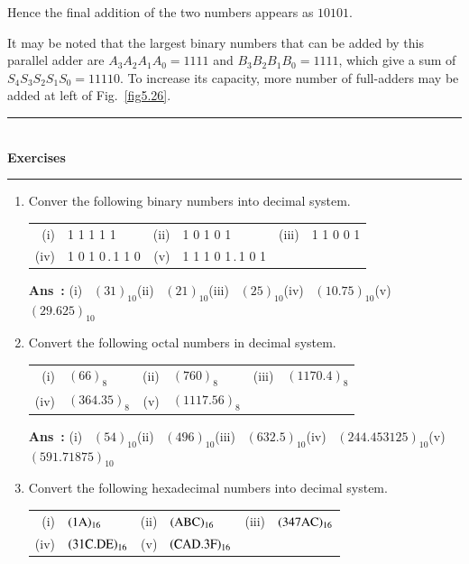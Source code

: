 Hence the final addition of the two numbers appears as $10101$.

It may be noted that the largest binary numbers that can be added by this parallel adder are $A_{3}A_{2}A_{1}A_{0}=1111$ and $B_{3}B_{2}B_{1}B_{0}=1111$, which give a sum of $S_{4}S_{3}S_{2}S_{1}S_{0}=11110$. To increase its capacity, more number of full-adders may be added at left of Fig.~\ref{fig5.26}.

\begin{center}
\rule{4cm}{1pt}\\
{\bf\Large Exercises}\\[-3pt]
\rule{4cm}{1pt}
\end{center}

\begin{enumerate}
\renewcommand{\labelenumi}{\bf\theenumi.}
\item Conver the following binary numbers into decimal system.

\smallskip
\begin{tabular}{r@{\;}l@{\qquad}r@{\;}l@{\qquad}r@{\;}l}
(i) & 1 1 1 1 1 & (ii) & 1 0 1 0 1 & (iii) & 1 1 0 0 1\\[3pt]
(iv) & 1 0 1 0\,.\,1 1 0 & (v) & 1 1 1 0 1\,.\,1 0 1
\end{tabular}

\smallskip
{\bf Ans~:} (i)~ $(31)_{10}$\hfil (ii)~ $(21)_{10}$\hfil (iii)~ $(25)_{10}$\hfil (iv)~ $(10.75)_{10}$\hfil (v)~ $(29.625)_{10}$

\item Convert the following octal numbers in decimal system.

\smallskip
\begin{tabular}{r@{\;}l@{\qquad}r@{\;}l@{\qquad}r@{\;}l}
(i) & $(66)_{8}$ & (ii) & $(760)_{8}$ & (iii) & $(1170.4)_{8}$\\[3pt]
(iv) & $(364.35)_{8}$ & (v) & $(1117.56)_{8}$
\end{tabular}

\smallskip
{\bf Ans~:} (i)~ $(54)_{10}$\hfil (ii)~ $(496)_{10}$\hfil (iii)~ $(632.5)_{10}$\hfil (iv)~ $(244.453125)_{10}$\hfil (v)~ $(591.71875)_{10}$

\item Convert the following hexadecimal numbers into decimal system.

\smallskip
\begin{tabular}{r@{\;}l@{\qquad}r@{\;}l@{\qquad}r@{\;}l}
(i) & $(1\textrm{A})_{16}$ & (ii) & $(\textrm{A}\textrm{B}\textrm{C})_{16}$ & (iii) & $(347\textrm{A}\textrm{C})_{16}$\\[5pt]
(iv) & $(31\textrm{C}.\textrm{D}\textrm{E})_{16}$ & (v) & $(\textrm{C}\textrm{A}\textrm{D}.3\textrm{F})_{16}$
\end{tabular}


\end{enumerate}
